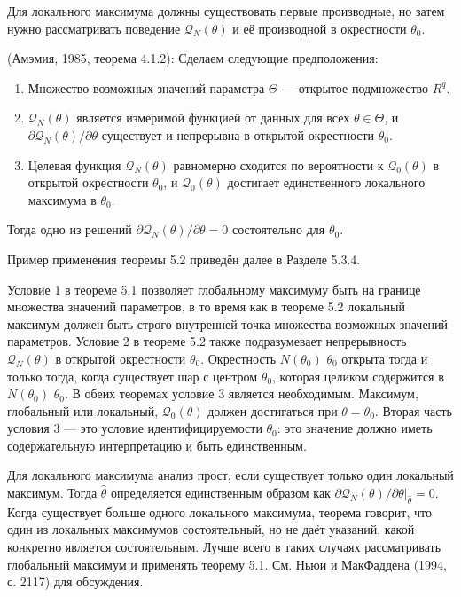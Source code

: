 Для локального максимума должны существовать первые производные, но затем нужно рассматривать поведение $\mathcal{Q}_N(\theta)$ и её производной в окрестности $\theta_0$.

\begin{theorem} (Амэмия, 1985, теорема 4.1.2): 
Сделаем следующие предположения:
\begin{enumerate}
\item Множество возможных значений параметра $\Theta$ --- открытое подмножество $R^q$.
\item $\mathcal{Q}_N(\theta)$ является измеримой функцией от данных для всех $\theta \in \Theta$, и  $\partial \mathcal{Q}_N(\theta) / \partial \theta $ существует и непрерывна в открытой окрестности $\theta_0$.
\item  Целевая функция $\mathcal{Q}_N(\theta)$ равномерно сходится по вероятности к $\mathcal{Q}_0(\theta)$ в открытой окрестности $\theta_0$, и  $\mathcal{Q}_0(\theta)$  достигает единственного локального максимума в $\theta_0$.
\end{enumerate}

Тогда одно из решений $\partial \mathcal{Q}_N(\theta) / \partial \theta =0 $ состоятельно для $\theta_0$. 
\end{theorem}

Пример применения теоремы 5.2 приведён далее в Разделе 5.3.4.

Условие 1 в теореме 5.1 позволяет глобальному максимуму быть на границе множества значений параметров, в то время как в теореме 5.2 локальный максимум должен быть строго внутренней точка множества возможных значений параметров. Условие 2 в теореме 5.2 также подразумевает непрерывность $\mathcal{Q}_N(\theta)$ в открытой окрестности $\theta_0$. Окрестность $N(\theta_0)$ $\theta_0$ открыта тогда и только тогда, когда существует шар с центром $\theta_0$, которая целиком содержится в $N(\theta_0)$ $\theta_0$. В обеих теоремах условие 3 является необходимым. Максимум, глобальный или локальный,  $\mathcal{Q}_0(\theta)$ должен достигаться при $\theta=\theta_0$. Вторая часть условия 3 --- это условие идентифицируемости $\theta_0$: это значение должно иметь  содержательную интерпретацию и быть единственным.

Для локального максимума анализ прост, если существует только один локальный максимум. Тогда 
$\hat{\theta}$ определяется единственным образом как $\partial \mathcal{Q}_N(\theta) / \partial \theta|_{\hat{\theta}}=0$. Когда существует больше одного локального максимума, теорема говорит, что один из локальных максимумов состоятельный, но не даёт указаний, какой конкретно является состоятельным. Лучше всего в таких случаях рассматривать глобальный максимум и применять теорему 5.1. См. Ньюи и МакФаддена (1994, с. 2117) для обсуждения.

